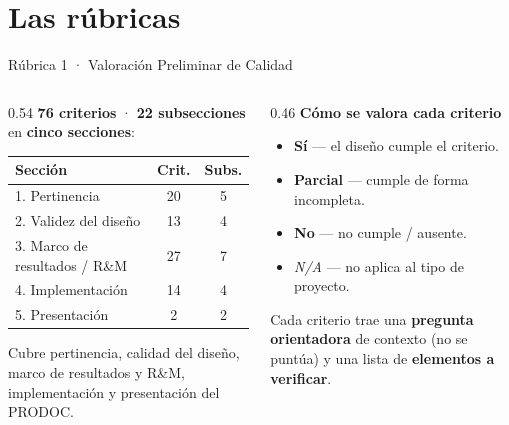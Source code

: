 \documentclass[aspectratio=169,11pt]{beamer}
\newcommand{\redlead}[1]{\textbf{\color{iloRed}#1}}
\newcommand{\bluelead}[1]{\textbf{\color{iloBlue}#1}}
\begin{document}
\section{Las rúbricas}
\begin{frame}{Rúbrica 1 · Valoración Preliminar de Calidad}
  \small
  \begin{columns}[T]
    \begin{column}{0.54\textwidth}
      \textbf{76 criterios} · \textbf{22 subsecciones} en \bluelead{cinco secciones}:
      \renewcommand{\arraystretch}{1.25}
      \begin{tabular}{@{}p{4.0cm}cc@{}}
        \toprule
        \rowcolor{iloBlue}\color{white}\textbf{Sección} & \color{white}\textbf{Crit.} & \color{white}\textbf{Subs.}\\
        \midrule
        1. Pertinencia & 20 & 5\\
        \rowcolor{iloGrayLt}2. Validez del diseño & 13 & 4\\
        3. Marco de resultados / R\&M & 27 & 7\\
        \rowcolor{iloGrayLt}4. Implementación & 14 & 4\\
        5. Presentación & 2 & 2\\
        \bottomrule
      \end{tabular}
      \vspace{0.15cm}\par
      {\footnotesize Cubre pertinencia, calidad del diseño, marco de resultados y R\&M, implementación y presentación del PRODOC.}
    \end{column}
    \begin{column}{0.46\textwidth}
      \textbf{Cómo se valora cada criterio}
      \begin{itemize}
        \item \bluelead{Sí} — el diseño cumple el criterio.
        \item \textbf{Parcial} — cumple de forma incompleta.
        \item \redlead{No} — no cumple / ausente.
        \item \textit{N/A} — no aplica al tipo de proyecto.
      \end{itemize}
      \vspace{0.2cm}
      Cada criterio trae una \bluelead{pregunta orientadora} de contexto (no se puntúa) y una lista de \textbf{elementos a verificar}.
    \end{column}
  \end{columns}
\end{frame}
\end{document}

